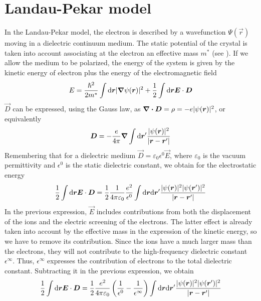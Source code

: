 \section{Landau-Pekar model} \label{sec:landau_pekar}
In the Landau-Pekar model, the electron is described by a wavefunction $\Psi(\vec{r})$ moving in a dielectric continuum medium. The static potential of the crystal is taken into account associating at the electron an effective mass $m^*$ (see ). If we allow the medium to be polarized, the energy of the system is given by the kinetic energy of electron plus the energy of the electromagnetic field
\begin{equation} \label{eq:energy_landau}
    E = \frac{\hslash^2}{2m^*} \int \differential\vec{r} |\grad \psi(\vec{r})|^2 + \oh \int \differential \vec{r} \vec{E}\cdot \vec{D}
\end{equation}
$\vec{D}$ can be expressed, using the Gauss law, as $\div\mathbf{\boldsymbol{D}} = \rho = -e |\psi(\mathbf{\boldsymbol{r}})|^2$, or equivalently
\begin{equation}
    \vec{D} = -\frac{e}{4\pi} \grad \int \differential \vec{r}' \frac{|\psi(\vec{r})|^2}{|\vec{r}-\vec{r}'|}
\end{equation}
Remembering that for a dielectric medium $\vec{D} = \varepsilon_0 \epsilon^0 \vec{E}$, where $\varepsilon_0$ is the vacuum permittivity and $\epsilon^0$ is the static dielectric constant, we obtain for the electrostatic energy
\begin{equation} \label{eq:electric_energy_e0}
    \oh \int \differential \vec{r}  \vec{E}\cdot \vec{D} =
    \oh \frac{1}{4\pi\varepsilon_0} \frac{e^2}{\epsilon^0} \int \differential \vec{r} \differential \vec{r}' \frac{|\psi(\vec{r})|^2|\psi(\vec{r}')|^2}{|\vec{r}-\vec{r}'|}
\end{equation}
In the previous expression, $\vec{E}$ includes contributions from both the displacement of the ions and the electric screening of the electrons. The latter effect is already taken into account by the effective mass in the expression of the kinetic energy, so we have to remove its contribution. Since the ions have a much larger mass than the electrons, they will not contribute to the high-frequency dielectric constant $\epsilon^\infty$. Thus, $\epsilon^\infty$ expresses the contribution of electrons to the total dielectric constant. Subtracting it in the previous expression, we obtain
\begin{equation}
    \oh \int \differential \vec{r} \vec{E}\cdot \vec{D} =
    \oh \frac{e^2}{4\pi\varepsilon_0} \left( \frac{1}{\epsilon^0} - \frac{1}{\epsilon^\infty} \right) \int \differential \vec{r} \differential \vec{r}' \frac{|\psi(\vec{r})|^2|\psi(\vec{r}')|^2}{|\vec{r}-\vec{r}'|}
\end{equation}
